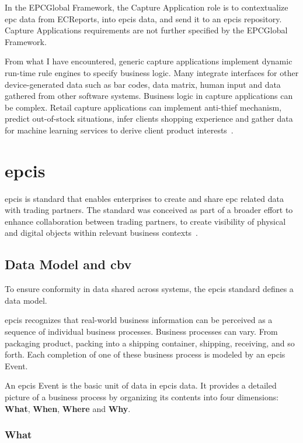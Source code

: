 In the EPCGlobal Framework, the Capture Application role is to contextualize \ac{epc} data from ECReports, into \ac{epcis} data, and send it to an \ac{epcis} repository.
Capture Applications requirements are not further specified by the EPCGlobal Framework.

From what I have encountered, generic capture applications implement dynamic run-time rule engines to specify business logic.
Many integrate interfaces for other device-generated data such as bar codes, data matrix, human input and data gathered from other software systems.
Business logic in capture applications can be complex. Retail capture applications can implement anti-thief mechanism, predict out-of-stock situations, infer clients shopping experience and gather data for machine learning services to derive client product interests~\cite{RFIDRetailKey}.

\section{\acf{epcis}}


\ac{epcis} is standard that enables enterprises to create and share \ac{epc} related data with trading partners.
The standard was conceived as part of a broader effort to enhance collaboration between trading partners, to create visibility of physical and digital objects within relevant business contexts~\cite{EPCISGuidelines}.

\subsection{Data Model and \acf{cbv}}

To ensure conformity in data shared across systems, the \ac{epcis} standard defines a data model.

\ac{epcis} recognizes that real-world business information can be perceived as a sequence of individual business processes.
Business processes can vary. From packaging product, packing into a shipping container, shipping, receiving, and so forth.
Each completion of one of these business process is modeled by an \ac{epcis} Event.

An \ac{epcis} Event is the basic unit of data in \ac{epcis} data.
It provides a detailed picture of a business process by organizing its contents into four dimensions: \textbf{What}, \textbf{When}, \textbf{Where} and \textbf{Why}.

\subsubsection{What}

